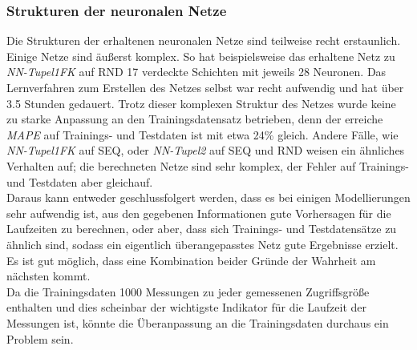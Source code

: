 \documentclass[
	12pt,
	a4paper,
	BCOR10mm,
	DIV14,
	listof=totoc,
	bibliography=totoc,
	headsepline
]{scrreprt}
\begin{document}
\begin{table}
	\centering
	\scriptsize
	\caption{Informationen über die Ausreißervorhersage der NN-Modelle auf SEQ}
	\label{tab:outlier}
\end{table}

\subsubsection{Strukturen der neuronalen Netze}
Die Strukturen der erhaltenen neuronalen Netze sind teilweise recht erstaunlich.
Einige Netze sind äußerst komplex.
So hat beispielsweise das erhaltene Netz zu \textit{NN-Tupel1FK} auf RND 17 verdeckte Schichten mit jeweils 28 Neuronen.
Das Lernverfahren zum Erstellen des Netzes selbst war recht aufwendig und hat über 3.5 Stunden gedauert.
Trotz dieser komplexen Struktur des Netzes wurde keine zu starke Anpassung an den Trainingsdatensatz betrieben, denn der erreiche \textit{MAPE} auf Trainings- und Testdaten ist mit etwa 24\% gleich. Andere Fälle, wie \textit{NN-Tupel1FK} auf SEQ, oder \textit{NN-Tupel2} auf SEQ und RND weisen ein ähnliches Verhalten auf; die berechneten Netze sind sehr komplex, der Fehler auf Trainings- und Testdaten aber gleichauf.\\
Daraus kann entweder geschlussfolgert werden, dass es bei einigen Modellierungen sehr aufwendig ist, aus den gegebenen Informationen gute Vorhersagen für die Laufzeiten zu berechnen, oder aber, dass sich Trainings- und Testdatensätze zu ähnlich sind, sodass ein eigentlich überangepasstes Netz gute Ergebnisse erzielt.
Es ist gut möglich, dass eine Kombination beider Gründe der Wahrheit am nächsten kommt.\\
Da die Trainingsdaten 1000 Messungen zu jeder gemessenen Zugriffsgröße enthalten und dies scheinbar der wichtigste Indikator für die Laufzeit der Messungen ist, könnte die Überanpassung an die Trainingsdaten durchaus ein Problem sein.\medskip
\end{document}
